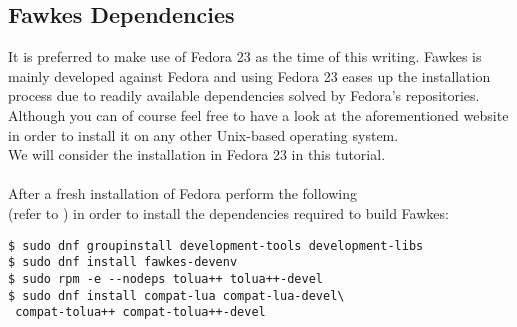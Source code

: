 \documentclass[oribibl]{llncs}
\begin{document}
\subsection{Fawkes Dependencies}
It is preferred to make use of Fedora 23 as the time of this writing. Fawkes is mainly developed against Fedora and using Fedora 23 eases up the installation process due to readily available dependencies solved by Fedora's repositories.\\
Although you can of course feel free to have a look at the aforementioned website in order to install it on any other Unix-based operating system.\\
We will consider the installation in Fedora 23 in this tutorial.\\
\\
After a fresh installation of Fedora perform the following\\(refer to ) in order to install the dependencies required to build Fawkes:
\begin{lstlisting}[frame=single]
$ sudo dnf groupinstall development-tools development-libs
$ sudo dnf install fawkes-devenv
$ sudo rpm -e --nodeps tolua++ tolua++-devel
$ sudo dnf install compat-lua compat-lua-devel\
 compat-tolua++ compat-tolua++-devel
\end{lstlisting}
\end{document}
